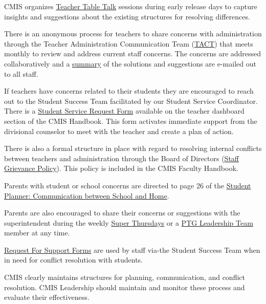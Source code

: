 \begin{findings}

CMIS organizes \href{https://drive.google.com/a/cmis.ac.th/file/d/0ByVFfrm0zfolWUs2RGMxczFXRXRqbDRjRlF2SGQ5cVZfV0FZ/view?usp=sharing}{Teacher Table Talk} sessions during early release days to capture insights and suggestions about the existing structures for resolving differences.

There is an anonymous process for teachers to share concerns with administration through the Teacher Administration Communication Team (\href{https://docs.google.com/a/cmis.ac.th/document/d/14nhwcw8xo3i-23Q-WUxo6KJ_c8yFKu-jTdCctt4MFcs/edit?usp=sharing}{TACT}) that meets monthly to review and address current staff concerns. The concerns are addressed collaboratively and a \href{https://docs.google.com/a/cmis.ac.th/document/d/1KLB4c5_LkxXzq4vP2EuNhBVPp2q_FT9qy1cBBwaS5JM/edit?usp=sharing}{summary} of the solutions and suggestions are e-mailed out to all staff.

If teachers have concerns related to their students they are encouraged to reach out to the Student Success Team facilitated by our Student Service Coordinator. There is a \href{https://docs.google.com/a/cmis.ac.th/forms/d/e/1FAIpQLScVtFtaEXarGOjwsiJyGdbLAMbeNzG9m44i1fWXFLbtMKZcUg/viewform}{Student Service Request Form} available on the teacher dashboard section of the CMIS Handbook. This form activates immediate support from the divisional counselor to meet with the teacher and create a plan of action.

There is also a formal structure in place with regard to resolving internal conflicts between teachers and administration  through the Board of Directors (\href{https://docs.google.com/a/cmis.ac.th/document/d/1RRBuWgqIb-BlwD8vTRrTG0u_FCHgQFD_oEbvseNdAPc/edit?usp=sharing}{Staff Grievance Policy}). This policy is included in the CMIS Faculty Handbook.

Parents with student or school concerns are directed to page 26 of the \href{https://docs.google.com/document/d/1bIbV9pgGz2vpXYJdnRzL_Od5PS35egy7lgBOBuszgD4/edit}{Student Planner: Communication between School and Home}. 

Parents are also encouraged to share their concerns or suggestions with the superintendent during the weekly \href{http://blogs.cmis.ac.th/newsletter/2016/09/05/super-thursdays-starts-this-week/}{Super Thursdays} or a \href{http://blogs.cmis.ac.th/ptg/about/}{PTG Leadership Team} member at any time. 

\href{https://docs.google.com/a/cmis.ac.th/forms/d/e/1FAIpQLScVtFtaEXarGOjwsiJyGdbLAMbeNzG9m44i1fWXFLbtMKZcUg/viewform}{Request For Support Forms} are used by staff via-the Student Success Team when in need for conflict resolution with students.


CMIS clearly maintains structures for planning, communication, and conflict resolution. CMIS Leadership should maintain and monitor these process and evaluate their effectiveness. 

\end{findings}

